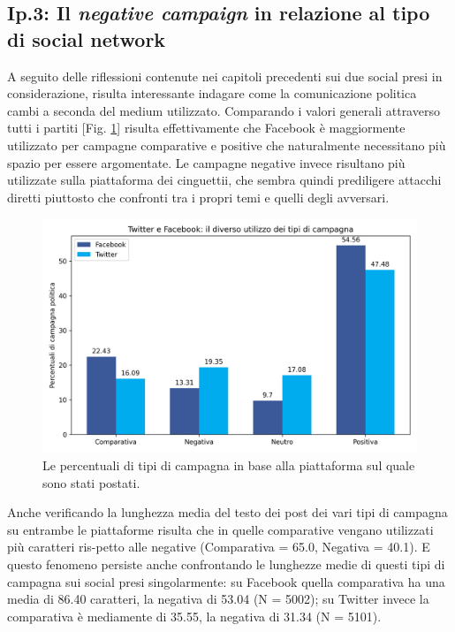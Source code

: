 \subsection{Ip.3: Il \textit{negative campaign} in relazione al tipo di social network}
A seguito delle riflessioni contenute nei capitoli precedenti sui due social presi in considerazione, risulta interessante indagare come la comunicazione politica cambi a seconda del medium utilizzato. Comparando i valori generali attraverso tutti i partiti [Fig. \ref{fig:site}] risulta effettivamente che Facebook è maggiormente utilizzato per campagne comparative e positive che naturalmente necessitano più spazio per essere argomentate. Le campagne negative invece risultano più utilizzate sulla piattaforma dei cinguettii, che sembra quindi prediligere attacchi diretti piuttosto che confronti tra i propri temi e quelli degli avversari.
\begin{figure}
	\includegraphics[width=\textwidth]{figures/site}
	\caption{Le percentuali di tipi di campagna in base alla piattaforma sul quale sono stati postati.}
	\label{fig:site}
\end{figure}

Anche verificando la lunghezza media del testo dei post dei vari tipi di campagna su  entrambe le piattaforme risulta che in quelle comparative vengano utilizzati più caratteri ris-petto alle negative (Comparativa = 65.0, Negativa = 40.1). E questo fenomeno persiste anche confrontando le lunghezze medie di questi tipi di campagna sui social presi singolarmente: su Facebook  quella comparativa ha una media di 86.40 caratteri, la negativa di 53.04 (N = 5002); su Twitter invece la comparativa è mediamente di 35.55, la negativa di 31.34 (N = 5101).


